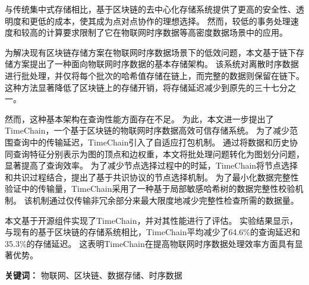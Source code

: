 \cleardoublepage
{}

与传统集中式存储相比，基于区块链的去中心化存储系统提供了更高的安全性、透明度和更低的成本，使其成为点对点协作的理想选择。
然而，较低的事务处理速度和较高的计算要求限制了它在物联网时序数据等高密度数据场景中的应用。

为解决现有区块链存储方案在物联网时序数据场景下的低效问题，本文基于链下存储方案提出了一种面向物联网时序数据的基本存储架构。
该系统对离散时序数据进行批处理，并仅将每个批次的哈希值存储在链上，而完整的数据则保留在链下。
这种方法显著降低了区块链上的存储开销，将存储延迟减少到原先的三十七分之一。

然而，这种基本架构在查询性能方面存在不足。
为此，本文进一步提出了TimeChain，一个基于区块链的物联网时序数据高效可信存储系统。
为了减少范围查询中的传输延迟，TimeChain引入了自适应打包机制。
通过将数据和历史协同查询特征分别表示为图的顶点和边权重，本文将批处理问题转化为图划分问题，显著提高了查询效率。
为了减少节点选择过程中的时延，TimeChain将节点选择和共识过程结合，提出了基于共识协议的节点选择机制。
为了最小化数据完整性验证中的传输量，TimeChain采用了一种基于局部敏感哈希树的数据完整性校验机制。
该机制通过仅传输非冗余部分来最大限度地减少完整性检查所需的数据量。

本文基于开源组件实现了TimeChain，并对其性能进行了评估。
实验结果显示，与现有的基于区块链的存储系统相比，TimeChain平均减少了64.6\%的查询延迟和35.3\%的存储延迟。
这表明TimeChain在提高物联网时序数据处理效率方面具有显著优势。

\textbf{关键词：} 物联网、区块链、数据存储、时序数据